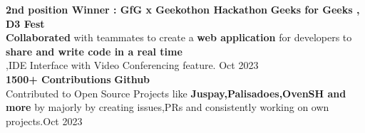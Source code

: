\textbf{2nd position Winner : GfG x Geekothon Hackathon} \hfill \textbf{Geeks for Geeks , D3 Fest}\\
\textbf{Collaborated} with teammates to create a \textbf{web application} for developers to \textbf{share and write code
in a real time}\\,IDE Interface with Video Conferencing feature. \hfill Oct 2023\\
\vspace{1.2mm}
\textbf{1500+ Contributions} \hfill \textbf{Github}\\
Contributed to Open Source Projects like \textbf{Juspay,Palisadoes,OvenSH and more} by majorly by creating issues,PRs and consistently working on own projects.\hfill Oct 2023\\
\ 
